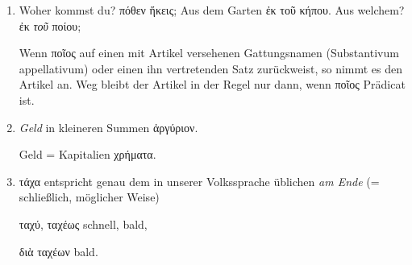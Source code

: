\begin{enumerate}[leftmargin=0pt,rightmargin=0pt,listparindent =1cm,labelindent=1cm,labelsep=1ex,labelwidth={*},itemindent={*},align=left]
\item Woher kommst du? \textgreek[variant=ancient]{πόθεν ἥκεις;} Aus dem
Garten \textgreek[variant=ancient]{ἐκ τοῦ κήπου.} Aus welchem? \textgreek[variant=ancient]{ἐκ
\emph{τοῦ} ποίου;}


Wenn \textgreek[variant=ancient]{ποῖος} auf einen mit Artikel versehenen
Gattungsnamen \textlatin{(Substantivum appellativum)} oder einen ihn
vertretenden Satz zurückweist, so nimmt es den Artikel an. Weg bleibt
der Artikel in der Regel nur dann, wenn \textgreek[variant=ancient]{ποῖος}
Prädicat ist. 

\item \emph{Geld} in kleineren Summen \textgreek[variant=ancient]{ἀργύριον.}


\begin{continuousitemline}Geld = Kapitalien \textgreek[variant=ancient]{χρήματα.
}\par\end{continuousitemline}

\item \textgreek[variant=ancient]{τάχα} ent\textcompwordmark{}spricht
genau dem in unserer Volks\textcompwordmark{}sprache üblichen \emph{am
Ende} (= schließlich, möglicher Weise)


\textgreek[variant=ancient]{ταχύ, ταχέως} schnell, bald,


\textgreek[variant=ancient]{διὰ ταχέων} bald. 


\end{enumerate}
